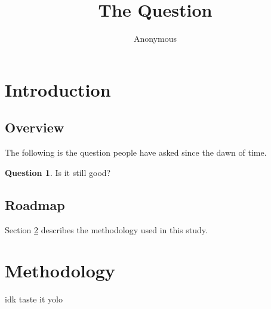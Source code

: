 \documentclass[11pt, letterpaper]{article}
\title{The Question}
\author{Anonymous}
\theoremstyle{definition}
\newtheorem{qq}[thm]{Question}
\begin{document}
\maketitle

\section{Introduction}
\label{intro}

\subsection{Overview}
\label{overview}

The following is the question people have asked since the dawn of time.

\begin{qq}
    \label{the_question}
    Is it still good?
\end{qq}

\subsection{Roadmap}

Section \ref{methods} describes the methodology used in this study.

\section{Methodology}
\label{methods}

idk taste it yolo
\end{document}

